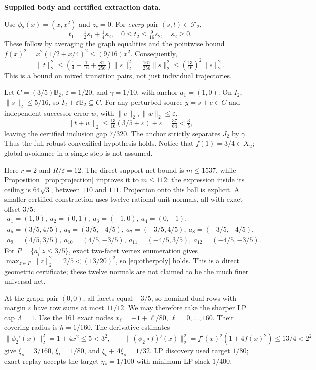 \documentclass[10pt,letterpaper]{article}
\theoremstyle{remark}
\begin{document}
\textbf{Supplied body and certified extraction data.}

Use $\phi_2(x)=(x,x^2)$ and $z_c=0$. For \emph{every} pair $(s,t)\in\mathcal F_2$,
\[
 t_1=\tfrac12s_1+\tfrac14s_2,\quad
 0\leq t_2\leq\tfrac9{16}s_2,\quad s_2\geq0.
\]
These follow by averaging the graph equalities and the pointwise bound
$f(x)^2=x^2(1/2+x/4)^2\leq(9/16)x^2$.
Consequently,
\[
 \|t\|_2^2\leq
 \left(\tfrac14+\tfrac1{16}+\tfrac{81}{256}\right)\|s\|_2^2
 =\tfrac{161}{256}\|s\|_2^2
 \leq(\tfrac{13}{16})^2\|s\|_2^2.
\]
This is a bound on mixed transition pairs, not just individual trajectories.

Let $C=(3/5)\mathbb B_2$, $\varepsilon=1/20$, and $\gamma=1/10$, with anchor $a_1=(1,0)$. On $I_2$,
$\|s\|_2\leq5/16$, so $I_2+\varepsilon\mathbb B_2\subseteq C$.
For any perturbed source $y=s+e\in C$ and independent successor error $w$, with $\|e\|_2,\|w\|_2\leq\varepsilon$,
\[
 \|t+w\|_2\leq\tfrac{13}{16}(3/5+\varepsilon)+\varepsilon
 =\tfrac{37}{64}<\tfrac35,
\]
leaving the certified inclusion gap $7/320$. The anchor strictly separates $J_2$ by $\gamma$. Thus the full robust convexified hypothesis holds. Notice that $f(1)=3/4\in X_u$; global avoidance in a single step is not assumed.

Here $r=2$ and $R/\varepsilon=12$. The direct support-net bound is $m\leq1537$, while Proposition~\ref{prop:projection} improves it to $m\leq112$: the expression inside its ceiling is $64\sqrt3$, between $110$ and $111$. Projection onto this ball is explicit. A smaller certified construction uses twelve rational unit normals, all with exact offset $3/5$:
\[
 \begin{gathered}
 a_1=(1,0),\ a_2=(0,1),\ a_3=(-1,0),\ a_4=(0,-1),\\
 a_5=(3/5,4/5),\ a_6=(3/5,-4/5),\
 a_7=(-3/5,4/5),\ a_8=(-3/5,-4/5),\\
 a_9=(4/5,3/5),\ a_{10}=(4/5,-3/5),\
 a_{11}=(-4/5,3/5),\ a_{12}=(-4/5,-3/5).
 \end{gathered}
\]
For $P=\{a_i^\top z\leq3/5\}$, exact two-facet vertex enumeration gives
$\max_{z\in P}\|z\|_2^2=2/5<(13/20)^2$, so \eqref{eq:otherpoly} holds. This is a direct geometric certificate; these twelve normals are not claimed to be the much finer universal net.

At the graph pair $(0,0)$, all facets equal $-3/5$, so nominal dual rows with margin $\varepsilon$ have row sums at most $11/12$. We may therefore take the sharper LP cap $\Lambda=1$.
Use the 161 exact nodes $x_\ell=-1+\ell/80$, $\ell=0,\ldots,160$.
Their covering radius is $h=1/160$. The derivative estimates
\[
 \|\phi_2'(x)\|_2^2=1+4x^2\leq5<3^2,\qquad
 \|(\phi_2\circ f)'(x)\|_2^2
 =f'(x)^2(1+4f(x)^2)\leq13/4<2^2
\]
give $\xi_s=3/160$, $\xi_t=1/80$, and
$\xi_t+\Lambda\xi_s=1/32$.
LP discovery used target $1/80$; exact replay accepts the target
$\eta_*=1/100$ with minimum LP slack $1/400$.
\end{document}
